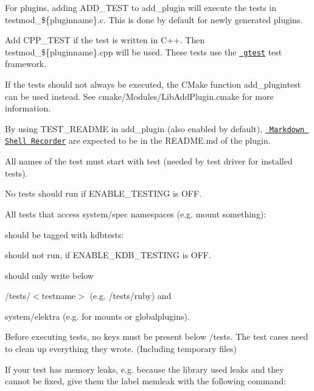 For plugins, adding {\ttfamily A\+D\+D\+\_\+\+T\+E\+ST} to {\ttfamily add\+\_\+plugin} will execute the tests in {\ttfamily testmod\+\_\+\$\{pluginname\}.c}. This is done by default for newly generated plugins.

Add {\ttfamily C\+P\+P\+\_\+\+T\+E\+ST} if the test is written in C++. Then {\ttfamily testmod\+\_\+\$\{pluginname\}.cpp} will be used. These tests use the \href{https://github.com/google/googletest}{\texttt{ gtest}} test framework.

If the tests should not always be executed, the C\+Make function {\ttfamily add\+\_\+plugintest} can be used instead. See cmake/\+Modules/\+Lib\+Add\+Plugin.\+cmake for more information.

By using {\ttfamily T\+E\+S\+T\+\_\+\+R\+E\+A\+D\+ME} in {\ttfamily add\+\_\+plugin} (also enabled by default), \href{https://master.libelektra.org/tests/shell/shell_recorder/tutorial_wrapper}{\texttt{ Markdown Shell Recorder}} are expected to be in the R\+E\+A\+D\+M\+E.\+md of the plugin.


\begin{DoxyItemize}
\item All names of the test must start with test (needed by test driver for installed tests).
\item No tests should run if E\+N\+A\+B\+L\+E\+\_\+\+T\+E\+S\+T\+I\+NG is O\+FF.
\item All tests that access system/spec namespaces (e.\+g. mount something)\+:
\item should be tagged with {\ttfamily kdbtests}\+:
\end{DoxyItemize}


\begin{DoxyCode}{0}
\end{DoxyCode}



\begin{DoxyItemize}
\item should not run, if {\ttfamily E\+N\+A\+B\+L\+E\+\_\+\+K\+D\+B\+\_\+\+T\+E\+S\+T\+I\+NG} is O\+FF.
\item should only write below
\begin{DoxyItemize}
\item {\ttfamily /tests/$<$testname$>$} (e.\+g. {\ttfamily /tests/ruby}) and
\item {\ttfamily system/elektra} (e.\+g. for mounts or globalplugins).
\end{DoxyItemize}
\item Before executing tests, no keys must be present below {\ttfamily /tests}. The test cases need to clean up everything they wrote. (Including temporary files)
\item If your test has memory leaks, e.\+g. because the library used leaks and they cannot be fixed, give them the label {\ttfamily memleak} with the following command\+:
\end{DoxyItemize}


